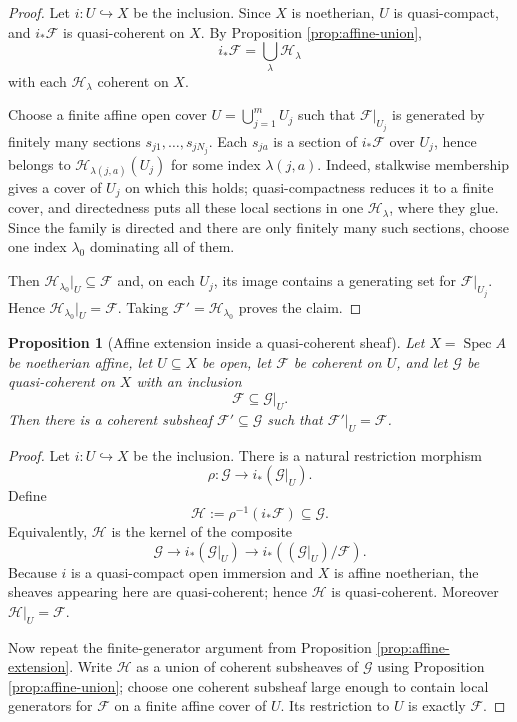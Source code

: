 \documentclass[11pt]{amsart}
\DeclareMathOperator{\Spec}{Spec}
\newcommand{\F}{\mathscr F}
\newcommand{\G}{\mathscr G}
\newcommand{\Hh}{\mathscr H}
\newcommand{\into}{\hookrightarrow}
\theoremstyle{plain}
\newtheorem{proposition}[theorem]{Proposition}
\theoremstyle{definition}
\theoremstyle{remark}
\begin{document}
\begin{proof}
Let $i:U\into X$ be the inclusion.  Since $X$ is noetherian, $U$ is quasi-compact, and $i_*\F$ is quasi-coherent on $X$.  By Proposition \ref{prop:affine-union},
\[
  i_*\F = \bigcup_\lambda \Hh_\lambda
\]
with each $\Hh_\lambda$ coherent on $X$.

Choose a finite affine open cover $U=\bigcup_{j=1}^m U_j$ such that $\F|_{U_j}$ is generated by finitely many sections $s_{j1},\ldots,s_{jN_j}$.  Each $s_{ja}$ is a section of $i_*\F$ over $U_j$, hence belongs to $\Hh_{\lambda(j,a)}(U_j)$ for some index $\lambda(j,a)$. Indeed, stalkwise membership gives a cover of $U_j$ on which this holds; quasi-compactness reduces it to a finite cover, and directedness puts all these local sections in one $\Hh_\lambda$, where they glue.  Since the family is directed and there are only finitely many such sections, choose one index $\lambda_0$ dominating all of them.

Then $\Hh_{\lambda_0}|_U\subseteq \F$ and, on each $U_j$, its image contains a generating set for $\F|_{U_j}$.  Hence $\Hh_{\lambda_0}|_U=\F$.  Taking $\F'=\Hh_{\lambda_0}$ proves the claim.
\end{proof}

\begin{proposition}[Affine extension inside a quasi-coherent sheaf]\label{prop:affine-extension-sub}
Let $X=\Spec A$ be noetherian affine, let $U\subseteq X$ be open, let $\F$ be coherent on $U$, and let $\G$ be quasi-coherent on $X$ with an inclusion
\[
  \F \subseteq \G|_U.
\]
Then there is a coherent subsheaf $\F'\subseteq \G$ such that $\F'|_U=\F$.
\end{proposition}

\begin{proof}
Let $i:U\into X$ be the inclusion.  There is a natural restriction morphism
\[
  \rho:\G\longrightarrow i_*(\G|_U).
\]
Define
\[
  \Hh := \rho^{-1}(i_*\F)\subseteq \G.
\]
Equivalently, $\Hh$ is the kernel of the composite
\[
  \G \longrightarrow i_*(\G|_U) \longrightarrow i_*((\G|_U)/\F).
\]
Because $i$ is a quasi-compact open immersion and $X$ is affine noetherian, the sheaves appearing here are quasi-coherent; hence $\Hh$ is quasi-coherent.  Moreover $\Hh|_U=\F$.

Now repeat the finite-generator argument from Proposition \ref{prop:affine-extension}.  Write $\Hh$ as a union of coherent subsheaves of $\G$ using Proposition \ref{prop:affine-union}; choose one coherent subsheaf large enough to contain local generators for $\F$ on a finite affine cover of $U$.  Its restriction to $U$ is exactly $\F$.
\end{proof}
\end{document}
